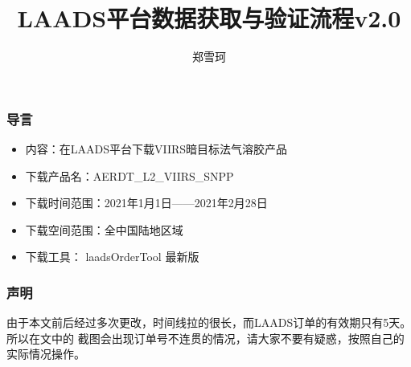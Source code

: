 \documentclass{ctexbeamer}
\title{LAADS平台数据获取与验证流程v2.0}
\author{郑雪珂}
\institute{lengfeng1453@hotmail.com}
\begin{document}
\frame{\titlepage}
\begin{frame}
  \frametitle{导言}
  \begin{itemize}
    \item 内容：在LAADS平台下载VIIRS暗目标法气溶胶产品
    \item 下载产品名：AERDT\_L2\_VIIRS\_SNPP
    \item 下载时间范围：2021年1月1日——2021年2月28日
    \item 下载空间范围：全中国陆地区域
    \item 下载工具： laadsOrderTool 最新版
  \end{itemize}
\end{frame}
\begin{frame}
  \frametitle{声明}
  由于本文前后经过多次更改，时间线拉的很长，而LAADS订单的有效期只有5天。所以在文中的
  截图会出现订单号不连贯的情况，请大家不要有疑惑，按照自己的实际情况操作。

  

\end{frame}


% 

\end{document}
